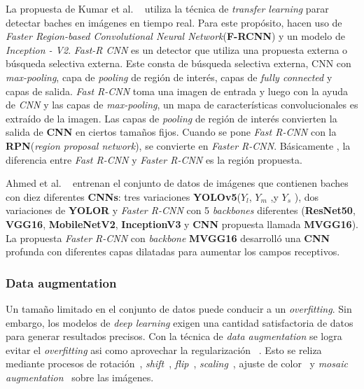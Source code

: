 	La propuesta de Kumar et al. ~ utiliza la técnica de \emph{transfer learning} parar detectar baches en imágenes 
	en tiempo real. Para este propósito, hacen uso de \emph{Faster Region-based Convolutional Neural Network}(\textbf{F-RCNN}) y un modelo de
	\emph{Inception - V2}. \emph{Fast-R CNN} es un detector que utiliza una propuesta externa 
	o búsqueda selectiva externa. Este consta de  búsqueda selectiva externa, CNN con \emph{max-pooling}, capa de \emph{pooling} de 
	región de interés, capas de \emph{fully connected} y capas de salida. \emph{Fast R-CNN} toma una imagen de entrada y luego con  la 
	ayuda de \emph{CNN} y las capas de \emph{max-pooling}, un mapa de características convolucionales es extraído de la imagen. Las 
	capas de \emph{pooling} de región de interés convierten la salida de \textbf{CNN} en ciertos tamaños fijos. Cuando se pone 
	\emph{Fast R-CNN} con la \textbf{RPN}(\emph{region proposal network}), se convierte en \emph{Faster R-CNN}. Básicamente , la 
	diferencia entre \emph{Fast R-CNN} y \emph{Faster R-CNN} es la región propuesta.

	Ahmed et al. ~ entrenan el conjunto de datos de imágenes que contienen baches con diez diferentes 
	\textbf{CNNs}: tres variaciones  \textbf{YOLOv5}($Y_l$, $Y_m$ ,y $Y_s$ ), dos variaciones de \textbf{YOLOR} y \emph{Faster R-CNN} 
	con 5 \emph{backbones} diferentes (\textbf{ResNet50}, \textbf{VGG16}, \textbf{MobileNetV2}, \textbf{InceptionV3}  y  \textbf{CNN} 
	propuesta llamada  \textbf{MVGG16}). La propuesta \emph{Faster R-CNN} con \emph{backbone} \textbf{MVGG16} desarrolló una 
	\textbf{CNN} profunda con diferentes capas dilatadas para aumentar los campos receptivos.

		\subsubsection{Data augmentation}
			Un tamaño limitado en el conjunto de datos puede conducir a un \emph{overfitting}. Sin embargo, los modelos de \emph{deep learning}
			exigen una cantidad satisfactoria de datos para generar resultados precisos. Con la técnica de \emph{data augmentation} se logra evitar 
			el \emph{overfitting} asi como aprovechar la regularización ~. 
			Esto se reliza mediante procesos de rotación~, \emph{shift}~, 
			\emph{flip}~, \emph{scaling}~, ajuste de color~ y 
			\emph{mosaic augmentation}~ sobre las imágenes.

